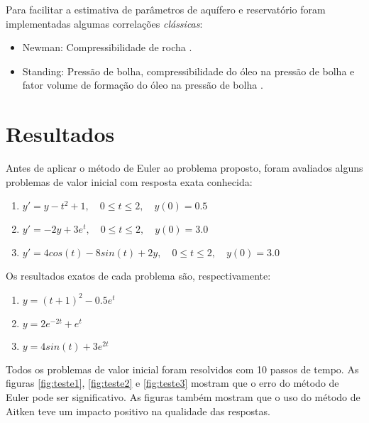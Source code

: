\documentclass[final,5p]{elsarticle}
\numberwithin{equation}{section}
\begin{document}
        Para facilitar a estimativa de parâmetros de aquífero e reservatório foram implementadas algumas correlações \emph{clássicas}:

        \begin{itemize}
            \item Newman: Compressibilidade de rocha \cite{10.2118/3835-PA}.
            \item Standing: Pressão de bolha, compressibilidade do óleo na pressão de bolha e fator volume de formação do óleo na pressão de bolha \cite{standing1952volumetric}.
        \end{itemize}


\section{Resultados}

        Antes de aplicar o método de Euler ao problema proposto, foram avaliados alguns problemas de valor inicial com resposta exata conhecida:

        \begin{enumerate}
            \item $y' = y - t^2 + 1, \quad 0 \leq t \leq  2, \quad y(0) = 0.5$ \label{item:pvi1}
            \item $y' = -2y + 3 e^t, \quad 0 \leq t \leq  2, \quad y(0) = 3.0$ \label{item:pvi2}
            \item $y' = 4 cos(t) - 8 sin(t) + 2 y, \quad 0 \leq t \leq  2, \quad y(0) = 3.0$ \label{item:pvi3}
        \end{enumerate}

        Os resultados exatos de cada problema são, respectivamente:

        \begin{enumerate}
            \item $y = (t+1)^2 - 0.5 e^t$
            \item $y = 2 e^{-2 t} + e^t$
            \item $y = 4 sin(t) + 3 e^{2 t}$
        \end{enumerate}

        Todos os problemas de valor inicial foram resolvidos com 10 passos de tempo. As figuras \ref{fig:teste1}, \ref{fig:teste2} e \ref{fig:teste3} mostram que o erro do método de Euler pode ser significativo. As figuras também mostram que o uso do método de Aitken teve um impacto positivo na qualidade das respostas.
\end{document}
